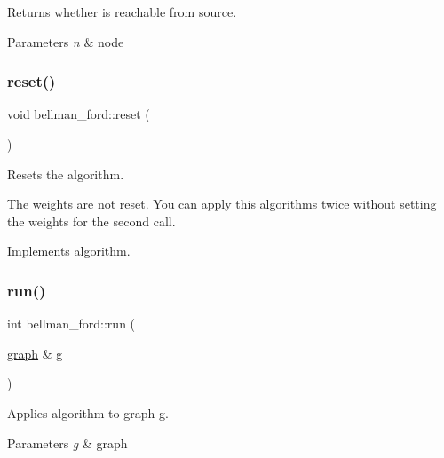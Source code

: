 Returns whether is reachable from source. 


\begin{DoxyParams}{Parameters}
{\em n} & node \\
\hline
\end{DoxyParams}
\mbox{\label{classbellman__ford_a7d28afa62ce8068c4d0f2d1f96136fd6}} 
\subsubsection{\texorpdfstring{reset()}{reset()}}
{\footnotesize\ttfamily void bellman\+\_\+ford\+::reset (\begin{DoxyParamCaption}{ }\end{DoxyParamCaption})\hspace{0.3cm}{\ttfamily [virtual]}}



Resets the algorithm. 

The weights are not reset. You can apply this algorithms twice without setting the weights for the second call. 

Implements \mbox{\hyperlink{classalgorithm_a21aba63d066ae7897de6ca7d8425c408}{algorithm}}.

\mbox{\label{classbellman__ford_a226308389f3c36dfc02768c09f777a3b}} 
\subsubsection{\texorpdfstring{run()}{run()}}
{\footnotesize\ttfamily int bellman\+\_\+ford\+::run (\begin{DoxyParamCaption}\item[{\mbox{\hyperlink{classgraph}{graph}} \&}]{g }\end{DoxyParamCaption})\hspace{0.3cm}{\ttfamily [virtual]}}



Applies algorithm to graph g. 


\begin{DoxyParams}{Parameters}
{\em g} & graph \\
\hline
\end{DoxyParams}

